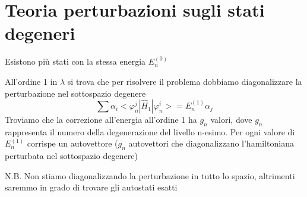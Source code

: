 \section{Teoria perturbazioni sugli stati degeneri}

Esistono più stati con la stessa energia \(E^{(0)}_n\)

\noindent All'ordine 1 in \(\lambda\) si trova che per risolvere il problema dobbiamo diagonalizzare la perturbazione nel sottospazio degenere
\begin{equation*}
    \sum \alpha_i < \varphi^j_n | \hat{H}_1 | \varphi^i_n> = E^{(1)}_n \alpha_j
\end{equation*}
Troviamo che la correzione all'energia all'ordine 1 ha \(g_n\) valori, dove \(g_n\) rappresenta il numero della degenerazione del livello n-esimo. Per ogni valore di \(E^{(1)}_n\) corrispe un autovettore (\(g_n\) autovettori che diagonalizzano l'hamiltoniana perturbata nel sottospazio degenere)

\noindent N.B. \; Non stiamo diagonalizzando la perturbazione in tutto lo spazio, altrimenti saremmo in grado di trovare gli autostati esatti

